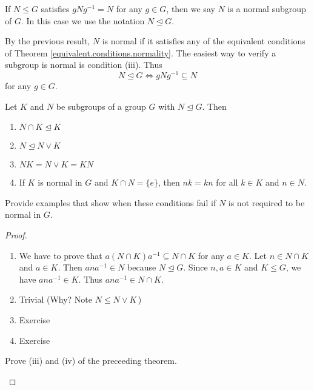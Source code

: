 \documentclass[11pt,a4paper]{article}
\begin{document}
\begin{defi}
    If \(N\leq G\) satisfies  \(gNg^{-1} = N\) for any \(g\in G\), then we say \(N\) is a normal subgroup of \(G\).
    In this case we use the notation \(N \unlhd G\).
\end{defi}

By the previous result, \(N\) is normal if it satisfies any of the equivalent conditions of Theorem \ref{equivalent.conditions.normality}.
The easiest way to verify a subgroup is normal is condition (iii).
Thus 
\[N\unlhd G\iff gNg^{-1}\subseteq N\] 
for any \(g\in G\).

\begin{teo}
    Let \(K\) and \(N\) be subgroups of a group \(G\) with \(N\unlhd G\). Then
    \begin{enumerate}[label=(\roman*)]
        \item \(N \cap K\unlhd K\) 
        \item \(N\unlhd N\vee K\)
        \item \(NK = N \vee K = KN\)
        \item If \(K\) is normal in \(G\) and \(K \cap N = \{e\}\), then \(nk = kn\) for all \(k \in K\) and \(n \in N\).
    \end{enumerate}
\end{teo}

\begin{eje}
    Provide examples that show when these conditions fail if \(N\) is not required to be normal in \(G\).
\end{eje}

\begin{proof}
\begin{enumerate}[label=(\roman*)]
    \item We have to prove that \(a (N\cap K) a^{-1}\subseteq N\cap K\) for any \(a\in K\).
     Let \(n \in N\cap K\) and \(a\in K\).
    Then \(ana^{-1}\in N\) because \(N\unlhd G\).
    Since \(n,a\in K\) and \(K\leq G\), we have \(ana^{-1}\in K\).
    Thus \(ana^{-1}\in N\cap K\).
    \item Trivial (Why? Note \(N \leq N \vee K\)\,)
    \item Exercise 
    \item Exercise
\end{enumerate}

\begin{eje}
    Prove (iii) and (iv) of the preceeding theorem.
\end{eje}

\end{proof}
 
\end{document}
